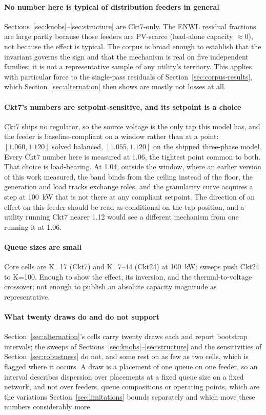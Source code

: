 \documentclass[review,authoryear,12pt]{elsarticle}
\begin{document}
\paragraph{No number here is typical of distribution feeders in general}
Sections~\ref{sec:knobs}--\ref{sec:structure} are Ckt7-only. The ENWL
residual fractions are large partly because those feeders are PV-scarce
(load-alone capacity $\approx 0$), not because the effect is typical. The
corpus is broad enough to establish that the invariant governs the sign and
that the mechanism is real on five independent families; it is not a
representative sample of any utility's territory. This applies with particular
force to the single-pass residuals of Section~\ref{sec:corpus-results}, which
Section~\ref{sec:alternation} then shows are mostly not losses at all.

\paragraph{Ckt7's numbers are setpoint-sensitive, and its setpoint is a choice}
Ckt7 ships no regulator, so the source voltage is the only tap this model has,
and the feeder is baseline-compliant on a window rather than at a point:
$[1.060, 1.120]$ solved balanced, $[1.055, 1.120]$ on the shipped three-phase
model. Every Ckt7 number here is measured at 1.06, the tightest point common to
both. That choice is load-bearing. At 1.04, outside the window, where an
earlier version of this work measured, the band binds from the ceiling
instead of the floor, the generation and load tracks exchange roles, and the
granularity curve acquires a step at 100~kW that is not there at any compliant
setpoint. The direction of an effect on this feeder should be read as
conditional on the tap position, and a utility running Ckt7 nearer 1.12 would
see a different mechanism from one running it at 1.06.

\paragraph{Queue sizes are small} Core cells are K=17 (Ckt7) and K=7--44
(Ckt24) at 100~kW; sweeps push Ckt24 to K=100. Enough to show the effect, its
inversion, and the thermal-to-voltage crossover; not enough to publish an
absolute capacity magnitude as representative.

\paragraph{What twenty draws do and do not support}
Section~\ref{sec:alternation}'s cells carry twenty draws each and report
bootstrap intervals; the sweeps of Sections~\ref{sec:knobs}--\ref{sec:structure}
and the sensitivities of Section~\ref{sec:robustness} do not, and some rest on
as few as two cells, which is flagged where it occurs. A draw is a placement of
one queue on one feeder, so an interval describes dispersion over placements at
a fixed queue size on a fixed network, and not over feeders, queue compositions
or operating points, which are the variations Section~\ref{sec:limitations}
bounds separately and which move these numbers considerably more.
\end{document}
